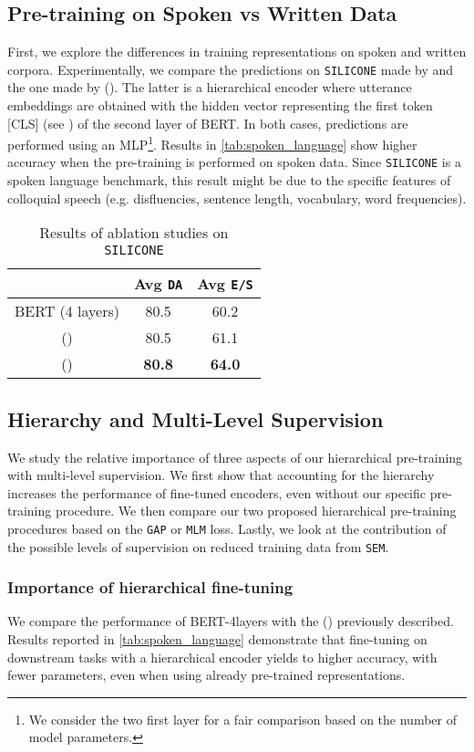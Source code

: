 \documentclass[11pt,a4paper]{article}
\begin{document}
\subsection{Pre-training on Spoken vs Written Data}
First, we explore the differences in training representations on spoken and written corpora. 
Experimentally, we compare the predictions on \texttt{SILICONE} made by  and the one made by ().
The latter is a hierarchical encoder where utterance embeddings are obtained with the hidden vector representing the first token [CLS] (see \cite{bert}) of the second layer of BERT.
In both cases, predictions are performed using an MLP\footnote{We consider the two first layer for a fair comparison based on the number of model parameters.}.
Results in \autoref{tab:spoken_language} show higher accuracy when the pre-training is performed on spoken data.
Since \texttt{SILICONE} is a spoken language benchmark, this result might be due to the specific features of colloquial speech (e.g. disfluencies, sentence length, vocabulary, word frequencies).
\begin{table}
\begin{center}
 \begin{tabular}{ c | c c } 
 \hline
 &Avg \texttt{DA} & Avg \texttt{E/S} \\ \hline
 BERT (4 layers)&80.5 & 60.2  \\
() & 80.5& 61.1\\
 () &\textbf{80.8} & \textbf{64.0}\\ 
\end{tabular}
\caption{Results of ablation studies on \texttt{SILICONE}}
 \label{tab:spoken_language}
\end{center}
\end{table}
\subsection{Hierarchy and Multi-Level Supervision}
We study the relative importance of three aspects of our hierarchical pre-training with multi-level supervision. We first show that accounting for the hierarchy increases the performance of fine-tuned encoders, even without our specific pre-training procedure.
We then compare our two proposed hierarchical pre-training procedures based on the \texttt{GAP} or \texttt{MLM} loss. Lastly, we look at the contribution of the possible levels of supervision on reduced training data from \texttt{SEM}.
\subsubsection{Importance of hierarchical fine-tuning}
We compare the performance of BERT-4layers with the () previously described.
Results reported in \autoref{tab:spoken_language} demonstrate that fine-tuning on downstream tasks with a hierarchical encoder yields to higher accuracy, with fewer parameters, even when using already pre-trained representations.
\end{document}

